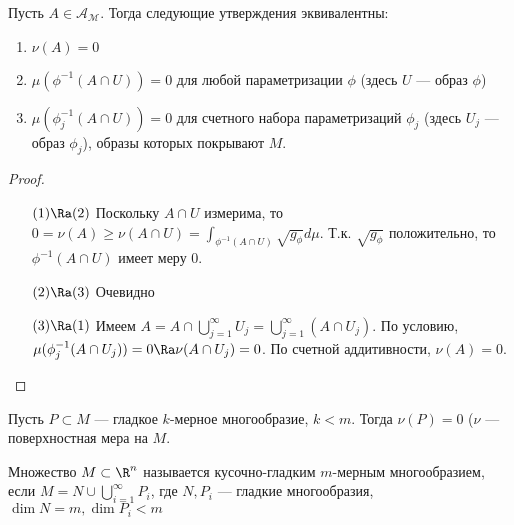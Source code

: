 \begin{lemma}
    Пусть \(A \in \mathcal{A_M}\). Тогда следующие утверждения эквивалентны:
    \begin{enumerate}
        \item \(\nu(A) = 0\)
        \item \(\mu(\phi^{-1}(A \cap U)) = 0\) для любой параметризации \(\phi\) (здесь \(U\) --- образ \(\phi\))
        \item \(\mu(\phi_j^{-1}(A \cap U)) = 0\) для счетного набора параметризаций \(\phi_j\) (здесь \(U_j\) --- образ \(\phi_j\)), образы которых покрывают \(M\).
    \end{enumerate}
\end{lemma}
\begin{proof}\indent
    \begin{enumerate}
        \item[\((1) \Ra (2)\)] Поскольку \(A \cap U\) измерима, то \(0 = \nu(A) \ge \nu(A \cap U) = \int_{\phi^{-1}(A \cap U)}\sqrt{g_\phi}d\mu\). Т.к. \(\sqrt{g_\phi}\) положительно, то \(\phi^{-1}(A \cap U)\) имеет меру \(0\).
        \item[\((2) \Ra (3)\)] Очевидно
        \item[\((3) \Ra (1)\)] Имеем \(A = A \cap \bigcup_{j = 1}^\infty U_j = \bigcup_{j = 1}^\infty (A \cap U_j)\). По условию, \(\mu(\phi_j^{-1}(A \cap U_j)) = 0 \Ra \nu(A \cap U_j) = 0\). По счетной аддитивности, \(\nu(A) = 0\).
    \end{enumerate}
\end{proof}

\begin{corollary}
    Пусть \(P \subset M\) --- гладкое \(k\)-мерное многообразие, \(k < m\). Тогда \(\nu(P) = 0\) (\(\nu\) --- поверхностная мера на \(M\).
\end{corollary}

\begin{definition}
    Множество \(M \subset \R^n\) называется кусочно-гладким \(m\)-мерным многообразием, если \(M = N \cup \bigcup_{i = 1}^\infty P_i\), где \(N, P_i\) --- гладкие многообразия, \(\dim N = m, \dim P_i < m\)
\end{definition}
